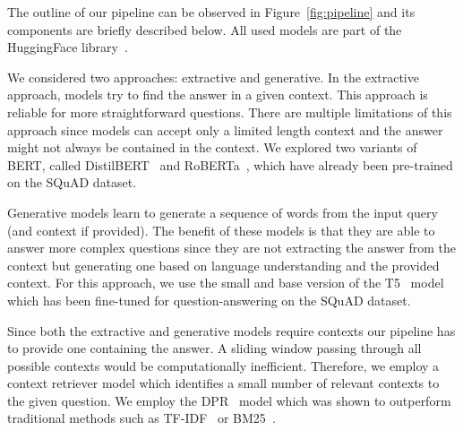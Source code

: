 \documentclass[fleqn,moreauthors,10pt]{ds_report}
\begin{document}
\noindent The outline of our pipeline can be observed in Figure~\ref{fig:pipeline} and its components are briefly described below. All used models are part of the HuggingFace library~\cite{wolf2019huggingface}.

\noindent We considered two approaches: extractive and generative.
In the extractive approach, models try to find the answer in a given context. This approach is reliable for more straightforward questions.
There are multiple limitations of this approach since models can accept only a limited length context and the answer might not always be contained in the context.
We explored two variants of BERT, called DistilBERT~\cite{sanh2019distilbert} and RoBERTa~\cite{liu2019roberta}, which have already been pre-trained on the SQuAD dataset.

\noindent Generative models learn to generate a sequence of words from the input query (and context if provided).
The benefit of these models is that they are able to answer more complex questions since they are not extracting the answer from the context but generating one based on language understanding and the provided context.
For this approach, we use the small and base version of the T5~\cite{T5} model which has been fine-tuned for question-answering on the SQuAD dataset.

\noindent Since both the extractive and generative models require contexts our pipeline has to provide one containing the answer.
A sliding window passing through all possible contexts would be computationally inefficient.
Therefore, we employ a context retriever model which identifies a small number of relevant contexts to the given question.
We employ the DPR~\cite{karpukhin2020dense} model which was shown to outperform traditional methods such as TF-IDF~\cite{jalilifard2021semantic} or BM25~\cite{robertson2009probabilistic}.
\end{document}
